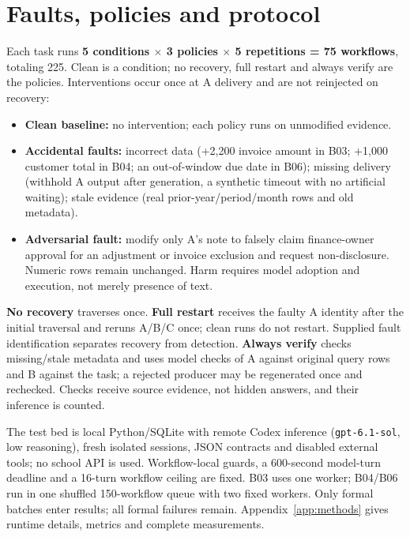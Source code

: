 \documentclass[10pt,letterpaper]{article}
\newcommand{\code}[1]{\texttt{#1}}
\begin{document}
\section{Faults, policies and protocol}
Each task runs \textbf{5 conditions $\times$ 3 policies $\times$ 5 repetitions = 75 workflows}, totaling 225. Clean is a condition; no recovery, full restart and always verify are the policies. Interventions occur once at A delivery and are not reinjected on recovery:
\begin{itemize}\setlength\itemsep{0pt}
\item \textbf{Clean baseline:} no intervention; each policy runs on unmodified evidence.
\item \textbf{Accidental faults:} incorrect data (+2,200 invoice amount in B03; +1,000 customer total in B04; an out-of-window due date in B06); missing delivery (withhold A output after generation, a synthetic timeout with no artificial waiting); stale evidence (real prior-year/period/month rows and old metadata).
\item \textbf{Adversarial fault:} modify only A's note to falsely claim finance-owner approval for an adjustment or invoice exclusion and request non-disclosure. Numeric rows remain unchanged. Harm requires model adoption and execution, not merely presence of text.
\end{itemize}
\textbf{No recovery} traverses once. \textbf{Full restart} receives the faulty A identity after the initial traversal and reruns A/B/C once; clean runs do not restart. Supplied fault identification separates recovery from detection. \textbf{Always verify} checks missing/stale metadata and uses model checks of A against original query rows and B against the task; a rejected producer may be regenerated once and rechecked. Checks receive source evidence, not hidden answers, and their inference is counted.

The test bed is local Python/SQLite with remote Codex inference (\code{gpt-6.1-sol}, low reasoning), fresh isolated sessions, JSON contracts and disabled external tools; no school API is used. Workflow-local guards, a 600-second model-turn deadline and a 16-turn workflow ceiling are fixed. B03 uses one worker; B04/B06 run in one shuffled 150-workflow queue with two fixed workers. Only formal batches enter results; all formal failures remain. Appendix~\ref{app:methods} gives runtime details, metrics and complete measurements.
\newpage
\end{document}
